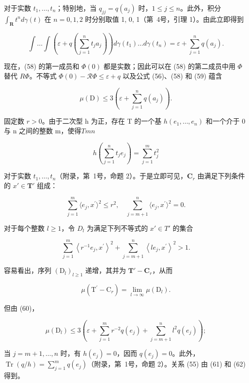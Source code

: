 对于实数 \(t_1, \ldots, t_n\)；特别地，当 \(q_{jj} = q(a_j)\) 时，\(1 \leqslant j \leqslant n\)。此外，积分 \(\int_{\mathbf{R}} t^n d\gamma(t)\) 在 \(n = 0, 1, 2\) 时分别取值 1, 0, 1（第~4号，引理 1）。由此立即得到

\[
\int \dots \int \left(\varepsilon + q \left(\sum_ {j = 1} ^ {n} t _ {j} a _ {j}\right)\right) d \gamma (t _ {1}) \dots d \gamma (t _ {n}) = \varepsilon + \sum_ {j = 1} ^ {n} q (a _ {j}).\tag{59}
\]

现在，(58) 的第一成员和 \(\Phi(0)\) 都是实数；因此可以在 (58) 的第二成员中用 \(\Phi\) 替代 \(R\Phi\)。不等式 \(\Phi(0)-\mathcal{R}\Phi\leqslant\varepsilon+q\) 以及公式 (56)、(58) 和 (59) 蕴含

\[
\mu (\mathrm{D}) \leqslant 3 \left(\varepsilon + \sum_ {j = 1} ^ {n} q (a _ {j})\right).\tag{60}
\]

固定数 \(r > 0\)。由于二次型 h 为正，存在 T 的一个基 \(h\)\((e_1, \ldots, e_n)\) 和一个介于 0 与 n 之间的整数 m，使得\(T\)\(m\)\(n\)

\[
h \left(\sum_ {j = 1} ^ {n} t _ {j} e _ {j}\right) = \sum_ {j = 1} ^ {m} t _ {j} ^ {2}
\]

对于实数 \(t_1, \ldots, t_n\)（附录，第~1号，命题 2）。于是立即可见，\(\mathbf{C}_r\) 由满足下列条件的 \(x' \in \mathbf{T}'\) 组成：

\[
\sum_ {j = 1} ^ {m} \langle e _ {j}, x ^ {\prime} \rangle^ {2} \leqslant r ^ {2}, \quad \sum_ {j = m + 1} ^ {n} \langle e _ {j}, x ^ {\prime} \rangle^ {2} = 0.
\]

对于每个整数 \(l \geqslant 1\)，令 \(D_l\) 为满足下列不等式的 \(x' \in T'\) 的集合

\[
\sum_ {j = 1} ^ {m} \left\langle r ^ {- 1} e _ {j}, x ^ {\prime} \right\rangle^ {2} + \sum_ {j = m + 1} ^ {n} \left\langle l e _ {j}, x ^ {\prime} \right\rangle^ {2} > 1.
\]

容易看出，序列 \((\mathrm{D}_l)_{l\geqslant 1}\) 递增，其并为 \(\mathbf{T}' - \mathbf{C}_r\)，从而

\[
\mu (\mathrm{T} ^ {\prime} - \mathrm{C} _ {r}) = \lim _ {l \to \infty} \mu (\mathrm{D} _ {l}).\tag{61}
\]

但由 (60)，

\[
\mu \left(\mathrm{D} _ {l}\right) \leqslant 3 \left(\varepsilon + \sum_ {j = 1} ^ {m} r ^ {- 2} q \left(e _ {j}\right) + \sum_ {j = m + 1} ^ {n} l ^ {2} q \left(e _ {j}\right)\right);\tag{62}
\]

当 \(j = m + 1, \ldots, n\) 时，有 \(h(e_j) = 0\)，因而 \(q(e_j) = 0\)。此外，\(\operatorname{Tr}(q/h) = \sum_{j=1}^{m} q(e_j)\)（附录，第~1号，命题 2）。关系 (55) 由 (61) 和 (62) 得到。

